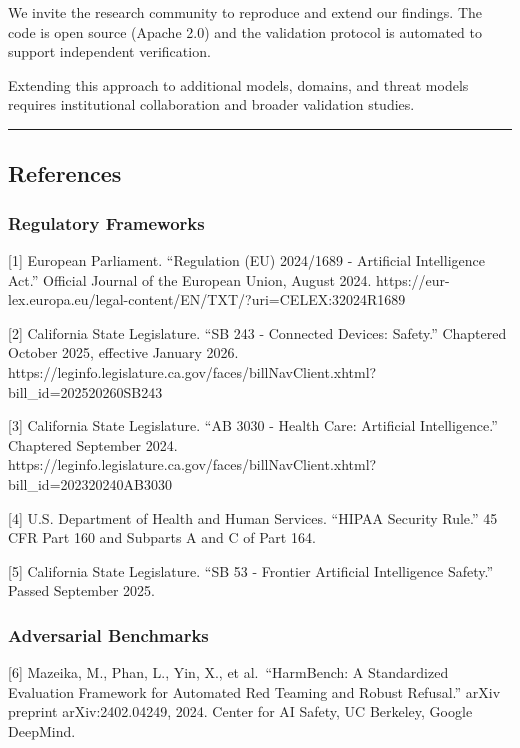 We invite the research community to reproduce and extend our findings.
The code is open source (Apache 2.0) and the validation protocol is
automated to support independent verification.

Extending this approach to additional models, domains, and threat models
requires institutional collaboration and broader validation studies.

\begin{center}\rule{0.5\linewidth}{0.5pt}\end{center}

\subsection{References}\label{references}

\subsubsection{Regulatory Frameworks}\label{regulatory-frameworks}

{[}1{]} European Parliament. ``Regulation (EU) 2024/1689 - Artificial
Intelligence Act.'' Official Journal of the European Union, August 2024.
https://eur-lex.europa.eu/legal-content/EN/TXT/?uri=CELEX:32024R1689

{[}2{]} California State Legislature. ``SB 243 - Connected Devices:
Safety.'' Chaptered October 2025, effective January 2026.
https://leginfo.legislature.ca.gov/faces/billNavClient.xhtml?bill\_id=202520260SB243

{[}3{]} California State Legislature. ``AB 3030 - Health Care:
Artificial Intelligence.'' Chaptered September 2024.
https://leginfo.legislature.ca.gov/faces/billNavClient.xhtml?bill\_id=202320240AB3030

{[}4{]} U.S. Department of Health and Human Services. ``HIPAA Security
Rule.'' 45 CFR Part 160 and Subparts A and C of Part 164.

{[}5{]} California State Legislature. ``SB 53 - Frontier Artificial
Intelligence Safety.'' Passed September 2025.

\subsubsection{Adversarial Benchmarks}\label{adversarial-benchmarks}

{[}6{]} Mazeika, M., Phan, L., Yin, X., et al.~``HarmBench: A
Standardized Evaluation Framework for Automated Red Teaming and Robust
Refusal.'' arXiv preprint arXiv:2402.04249, 2024. Center for AI Safety,
UC Berkeley, Google DeepMind.

